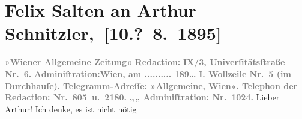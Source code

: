 

         \renewcommand{\erwaehnteInstitutionen}{Institutionen: Wiener Allgemeine Zeitung}
         \renewcommand{\erwaehnteOrte}{Orte: Bad Ischl, Hörlgasse, Universitätsstraße, Wien, Wollzeile}
         \renewcommand{\erwaehnteWerke}{}
               \section[ Felix Salten an Arthur Schnitzler, {[}10.? 8. 1895{]}]{ Felix Salten an Arthur Schnitzler, {[}10.? 8. 1895{]}}\nopagebreak{}\rehead{ }\begin{ledgroupsized}[t]{13cm}\normalsize\beginnumbering \toendnotes[C]{\smallbreak\pagebreak[2]} 
\toendnotes[C]{\smallbreak}\pstart
           \noindent{}{\pb}\textcolor{gray}{\textbf{\textbf{»Wiener Allgemeine
                        Zeitung«}}}\pend
           \pstart
           \textcolor{gray}{\textbf{Redaction:}}\pend
           \pstart
           \textcolor{gray}{\textbf{\textbf{IX/3, Univerſitätsſtraße Nr. 6.}}}\pend
           \pstart
           \textcolor{gray}{\textbf{Adminiſtration:}}\hfill \textcolor{gray}{\textbf{Wien, am ..........{ }189{\dots}}}\pend
           \pstart
           \textcolor{gray}{\textbf{\textbf{I. Wollzeile Nr. 5} (im Durchhauſe).}}\pend
           \pstart
           \textcolor{gray}{\textbf{Telegramm-Adreſſe: »Allgemeine, Wien«.}}\pend
           \pstart
           \textcolor{gray}{\textbf{Telephon der Redaction: Nr. 805 u. 2180.}}\pend
           \pstart
           \textcolor{gray}{\textbf{\hspace*{1.5em}„\hspace*{1.5em}„\hspace*{1.5em} Adminiſtration: Nr. 1024.}}\pend
           \pstart
           Lieber Arthur! Ich denke, es ist nicht nötig \label{K_L03162-1v}
\end{ledgroupsized}
